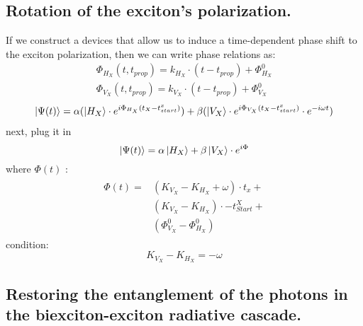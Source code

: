 \subsection{Rotation of the exciton's polarization.}
If we construct a devices that allow us to induce a time-dependent phase shift to the exciton polarization, then we can write phase relations as:
\begin{equation}
\begin{aligned} 
        &\Phi_{H_{X}}{(t,t_{prop})} = k_{H_{X}}\cdot(t-t_{prop}) + \Phi^0_{H_{X}} &\\
		&\Phi_{V_{X}}{(t,t_{prop})} = k_{V_{X}}\cdot(t-t_{prop}) + \Phi^0_{V_{X}} 
\end{aligned}
\end{equation}
\begin{equation}
\begin{split}
		\ket{\Psi(t)}= \alpha( \ket{H_{X}}\cdot e^{i\Phi_{H_{X}}(t_{X}-t^{x}_{start})})+
		\beta (\ket{V_{X}}\cdot e^{i\Phi_{V_{X}}(t_{X}-t^{x}_{start})}\cdot e^{-i\omega t})
  \end{split}
\end{equation} 
next, plug it in
\begin{equation}
	\ket{\Psi(t)} = \alpha\ket{H_X}+\beta\ket{V_X}\cdot e^{i\Phi}
\end{equation}
where $\Phi(t)$ :
\begin{equation}
\begin{split}  
\begin{aligned} 
	\Phi(t) = &(K_{V_X}-K_{H_X} + \omega)\cdot t_x +\\
 &(K_{V_X}-K_{H_X})\cdot-t^X_{Start}+\\
 &(\Phi^0_{V_{X}}-\Phi^0_{H_{X}})
 \end{aligned}
 \end{split}
\end{equation}
condition:
\begin{equation}
K_{V_X}-K_{H_X} =-\omega 
\end{equation}
\subsection{Restoring the entanglement of the photons in the biexciton-exciton radiative cascade.}

